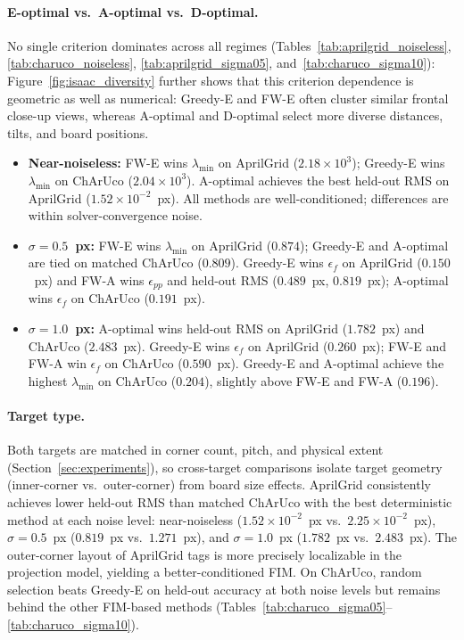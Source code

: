 \documentclass[letterpaper, 9
 pt, conference]{ieeeconf}
\begin{document}
\paragraph{E-optimal vs.\ A-optimal vs.\ D-optimal.}
No single criterion dominates across all regimes
(Tables~\ref{tab:aprilgrid_noiseless}, \ref{tab:charuco_noiseless},
\ref{tab:aprilgrid_sigma05}, and~\ref{tab:charuco_sigma10}):
Figure~\ref{fig:isaac_diversity} further shows that this criterion dependence is geometric as well as numerical: Greedy-E and FW-E often cluster similar frontal close-up views, whereas A-optimal and D-optimal select more diverse distances, tilts, and board positions.
\begin{itemize}
    \item \textbf{Near-noiseless:} FW-E wins $\lambda_{\min}$ on AprilGrid
    ($2.18\!\times\!10^3$); Greedy-E wins $\lambda_{\min}$ on ChArUco
    ($2.04\!\times\!10^3$). A-optimal achieves the best
    held-out RMS on AprilGrid ($1.52\!\times\!10^{-2}$~px). All methods
    are well-conditioned; differences are within solver-convergence noise.
    \item \textbf{$\sigma{=}0.5$~px:} FW-E wins $\lambda_{\min}$ on AprilGrid
    ($0.874$); Greedy-E and A-optimal are tied on matched ChArUco ($0.809$).
    Greedy-E wins $\epsilon_f$ on AprilGrid ($0.150$~px) and FW-A wins
    $\epsilon_{pp}$ and held-out RMS ($0.489$~px, $0.819$~px); A-optimal wins
    $\epsilon_f$ on ChArUco ($0.191$~px).
    \item \textbf{$\sigma{=}1.0$~px:} A-optimal wins held-out RMS on
    AprilGrid ($1.782$~px) and ChArUco ($2.483$~px).
    Greedy-E wins $\epsilon_f$ on AprilGrid ($0.260$~px); FW-E and FW-A win
    $\epsilon_f$ on ChArUco ($0.590$~px). Greedy-E and A-optimal achieve the
    highest $\lambda_{\min}$ on ChArUco ($0.204$), slightly above FW-E and
    FW-A ($0.196$).
\end{itemize}

\paragraph{Target type.}
Both targets are matched in corner count, pitch, and physical extent
(Section~\ref{sec:experiments}), so cross-target comparisons isolate
target geometry (inner-corner vs.\ outer-corner) from board size effects.
AprilGrid consistently achieves lower held-out RMS than matched ChArUco with
the best deterministic method at each noise level: near-noiseless
($1.52\!\times\!10^{-2}$~px vs.\ $2.25\!\times\!10^{-2}$~px),
$\sigma{=}0.5$~px ($0.819$~px vs.\ $1.271$~px),
and $\sigma{=}1.0$~px ($1.782$~px vs.\ $2.483$~px).
The outer-corner layout of AprilGrid tags is more precisely localizable in the
projection model, yielding a better-conditioned FIM.
On ChArUco, random selection beats Greedy-E on held-out accuracy at both
noise levels but remains behind the other FIM-based methods
(Tables~\ref{tab:charuco_sigma05}--\ref{tab:charuco_sigma10}).
\end{document}
